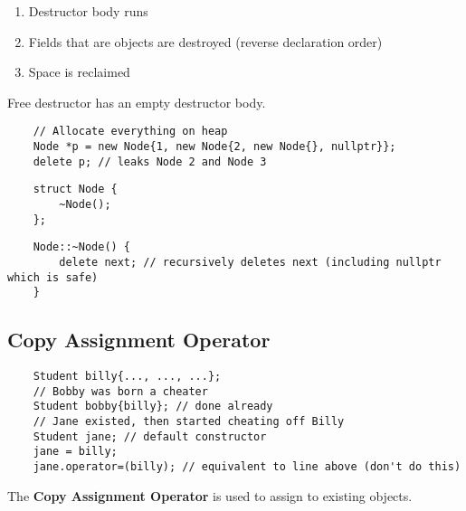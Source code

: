 \begin{enumerate}[(1)]
    \item Destructor body runs
    \item Fields that are objects are destroyed (reverse declaration order)
    \item Space is reclaimed
\end{enumerate}
Free destructor has an empty destructor body.
\begin{lstlisting}
    // Allocate everything on heap
    Node *p = new Node{1, new Node{2, new Node{}, nullptr}};
    delete p; // leaks Node 2 and Node 3
\end{lstlisting}

\begin{lstlisting}
    struct Node {
        ~Node();
    };
\end{lstlisting}
\begin{lstlisting}
    Node::~Node() {
        delete next; // recursively deletes next (including nullptr which is safe)
    }
\end{lstlisting}

\subsection{Copy Assignment Operator}
\begin{lstlisting}
    Student billy{..., ..., ...};
    // Bobby was born a cheater
    Student bobby{billy}; // done already
    // Jane existed, then started cheating off Billy
    Student jane; // default constructor
    jane = billy;
    jane.operator=(billy); // equivalent to line above (don't do this)
\end{lstlisting}
The \textbf{Copy Assignment Operator} is used to assign to existing objects.